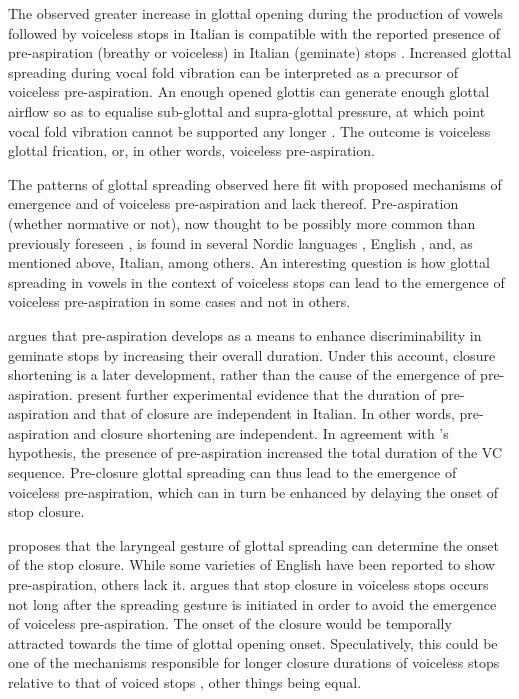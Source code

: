 \documentclass[
  11pt,
  a4paper,
]{article}
\begin{document}
The observed greater increase in glottal opening during the production
of vowels followed by voiceless stops in Italian is compatible with the
reported presence of pre-aspiration (breathy or voiceless) in Italian
(geminate) stops
\citep{ni-chasaide1993, stevens2004, stevens2004a, stevens2010, stevens2010b, stevens2014a}.
Increased glottal spreading during vocal fold vibration can be
interpreted as a precursor of voiceless pre-aspiration. An enough opened
glottis can generate enough glottal airflow so as to equalise
sub-glottal and supra-glottal pressure, at which point vocal fold
vibration cannot be supported any longer
\citep{berg1958, rothenberg1967, ohala2011}. The outcome is voiceless
glottal frication, or, in other words, voiceless pre-aspiration.

The patterns of glottal spreading observed here fit with proposed
mechanisms of emergence and of voiceless pre-aspiration and lack
thereof. Pre-aspiration (whether normative or not), now thought to be
possibly more common than previously foreseen \citep{helgason2002}, is
found in several Nordic languages \citet{helgason1999, helgason2002},
English \citep{gordeeva2007, nance2013, hejna2015a}, and, as mentioned
above, Italian, among others. An interesting question is how glottal
spreading in vowels in the context of voiceless stops can lead to the
emergence of voiceless pre-aspiration in some cases and not in others.

\citep{nichasaide1985} argues that pre-aspiration develops as a means to
enhance discriminability in geminate stops by increasing their overall
duration. Under this account, closure shortening is a later development,
rather than the cause of the emergence of pre-aspiration.
\citet{stevens2014} present further experimental evidence that the
duration of pre-aspiration and that of closure are independent in
Italian. In other words, pre-aspiration and closure shortening are
independent. In agreement with \citeauthor{nichasaide1985}'s hypothesis,
the presence of pre-aspiration increased the total duration of the VC
sequence. Pre-closure glottal spreading can thus lead to the emergence
of voiceless pre-aspiration, which can in turn be enhanced by delaying
the onset of stop closure.

\citet{lisker1974} proposes that the laryngeal gesture of glottal
spreading can determine the onset of the stop closure. While some
varieties of English have been reported to show pre-aspiration, others
lack it. \citeauthor{lisker1974} argues that stop closure in voiceless
stops occurs not long after the spreading gesture is initiated in order
to avoid the emergence of voiceless pre-aspiration. The onset of the
closure would be temporally attracted towards the time of glottal
opening onset. Speculatively, this could be one of the mechanisms
responsible for longer closure durations of voiceless stops relative to
that of voiced stops
\citep{lisker1957, umeda1977, van-summers1987, davis1989, de-jong1991},
other things being equal.
\end{document}
